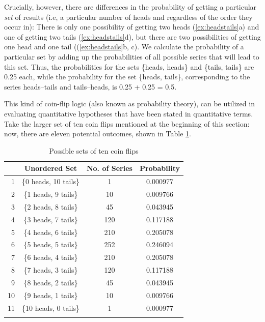 Crucially, however, there are differences in the probability of getting a particular \textit{set} of results (i.e, a particular number of heads and regardless of the order they occur in): There is only one possibility of getting two heads (\ref{ex:headstails}a) and one of getting two tails (\ref{ex:headstails}d), but there are two possibilities of getting one head and one tail ((\ref{ex:headstails}b, c). We calculate the probability of a particular set by adding up the probabilities of all possible series that will lead to this set. Thus, the probabilities for the sets \{heads, heads\} and \{tails, tails\} are 0.25 each, while the probability for the set \{heads, tails\}, corresponding to the series heads--tails and tails--heads, is 0.25 + 0.25 = 0.5.

This kind of coin-flip logic (also known as probability theory), can be utilized in evaluating quantitative hypotheses that have been stated in quantitative terms. Take the larger set of ten coin flips mentioned at the beginning of this section: now, there are eleven potential outcomes, shown in Table \ref{tab:tencoinflips}.

\begin{table}[!htbp]
\caption{Possible sets of ten coin flips}
\label{tab:tencoinflips}
\begin{tabular}[t]{rccc}
\lsptoprule & Unordered Set & No. of Series & Probability \\
\midrule                  
1 & \{0 heads, 10 tails\} & 1 & 0.000977 \\
2 & \{1 heads, 9 tails\} & 10 & 0.009766 \\
3 & \{2 heads, 8 tails\} & 45 & 0.043945 \\
4 & \{3 heads, 7 tails\} & 120 & 0.117188 \\
5 & \{4 heads, 6 tails\} & 210 & 0.205078 \\
6 & \{5 heads, 5 tails\} & 252 & 0.246094 \\
7 & \{6 heads, 4 tails\} & 210 & 0.205078 \\
8 & \{7 heads, 3 tails\} & 120 & 0.117188 \\
9 & \{8 heads, 2 tails\} & 45 & 0.043945 \\
10 & \{9 heads, 1 tails\} & 10 & 0.009766 \\
11 & \{10 heads, 0 tails\} & 1 & 0.000977 \\
\lspbottomrule
\end{tabular}
\end{table}

